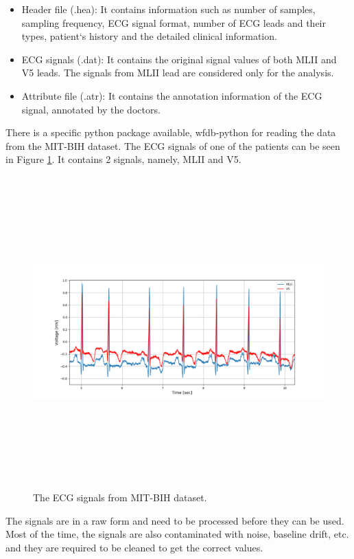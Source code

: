 \begin{itemize}
	\item Header file (.hea): It contains information such as number of samples, sampling frequency, ECG signal format, number of ECG leads and their types, patient`s history and the detailed clinical information.
	
	\item ECG signals (.dat): It contains the original signal values of both MLII and V5 leads. The signals from MLII lead are considered only for the analysis.
	
	\item Attribute file (.atr): It contains the annotation information of the ECG signal, annotated by the doctors.
\end{itemize}

There is a specific python package available, wfdb-python for reading the data from the MIT-BIH dataset. The ECG signals of one of the patients can be seen in Figure \ref{fig:all_signals}. It contains 2 signals, namely, MLII and V5.


\begin{figure}[h]
	\centering
	\includegraphics[width=15cm,height=12cm,keepaspectratio=true]{images/all_signals}
	\caption{
		The ECG signals from MIT-BIH dataset.
	}
	\label{fig:all_signals}
\end{figure}


The signals are in a raw form and need to be processed before they can be used. Most of the time, the signals are also contaminated with noise, baseline drift, etc. and they are required to be cleaned to get the correct values. 


